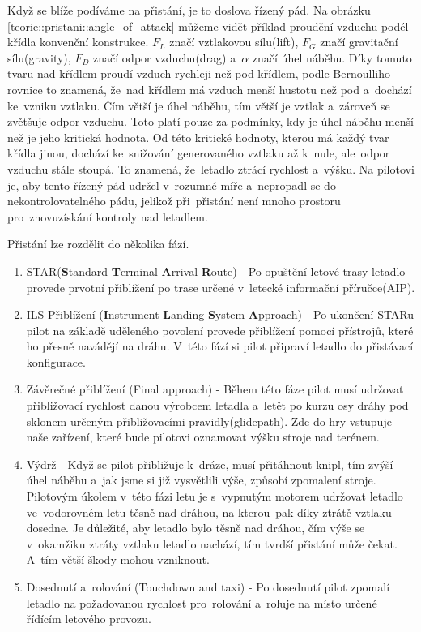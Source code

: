 		Když se blíže podíváme na přistání, je to doslova řízený pád. Na obrázku \ref{teorie::pristani::angle_of_attack} můžeme vidět příklad proudění vzduchu podél křídla konvenční konstrukce. $F_L$ značí vztlakovou sílu(lift), $F_G$ značí gravitační sílu(gravity), $F_D$ značí odpor vzduchu(drag) a~$\alpha$ značí úhel náběhu. Díky tomuto tvaru nad křídlem proudí vzduch rychleji než pod křídlem, podle Bernoulliho rovnice to znamená, že~nad křídlem má vzduch menší hustotu než pod a~dochází ke~vzniku vztlaku. Čím větší je úhel náběhu, tím větší je vztlak a~zároveň se zvětšuje odpor vzduchu. Toto platí pouze za podmínky, kdy je úhel náběhu menší než je jeho kritická hodnota. Od této kritické hodnoty, kterou má každý tvar křídla jinou, dochází ke~snižování generovaného vztlaku až k~nule, ale~odpor vzduchu stále stoupá. To znamená, že~letadlo ztrácí rychlost a~výšku. Na pilotovi je, aby tento řízený pád udržel v~rozumné míře a~nepropadl se do nekontrolovatelného pádu, jelikož při~přistání není mnoho prostoru pro~znovuzískání kontroly nad letadlem.\par
		Přistání lze rozdělit do několika fází\cite{landingPhases}\cite{ICAO}.
		
		\begin{enumerate}
			\item STAR(\textbf{S}tandard \textbf{T}erminal \textbf{A}rrival \textbf{R}oute) - Po opuštění letové trasy letadlo provede prvotní přiblížení po trase určené v~letecké informační příručce(AIP). 
			
			\item ILS Přiblížení (\textbf{I}nstrument \textbf{L}anding \textbf{S}ystem \textbf{A}pproach) - Po ukončení STARu pilot na základě uděleného povolení provede přiblížení pomocí přístrojů, které ho přesně navádějí na dráhu. V~této fází si pilot připraví letadlo do přistávací konfigurace.
		
			\item Závěrečné přiblížení (Final approach) - Během této fáze pilot musí udržovat přibližovací rychlost danou výrobcem letadla a~letět po kurzu osy dráhy pod sklonem určeným přibližovacími pravidly(glidepath). Zde do hry vstupuje naše zařízení, které bude pilotovi oznamovat výšku stroje nad terénem.
					
			\item Výdrž - Když se pilot přibližuje k~dráze, musí přitáhnout knipl, tím zvýší úhel náběhu a~jak jsme si již vysvětlili výše, způsobí zpomalení stroje. Pilotovým úkolem v~této fázi letu je s~vypnutým motorem udržovat letadlo ve~vodorovném letu těsně nad dráhou, na kterou~pak díky ztrátě vztlaku dosedne. Je důležité, aby letadlo bylo těsně nad dráhou, čím výše se v~okamžiku ztráty vztlaku letadlo nachází, tím tvrdší přistání může čekat. A~tím větší škody mohou vzniknout.
					
			\item Dosednutí a~rolování (Touchdown and taxi) - Po dosednutí pilot zpomalí letadlo na požadovanou rychlost pro~rolování a~roluje na místo určené řídícím letového provozu. 
		\end{enumerate}
				
